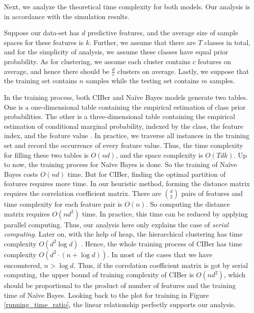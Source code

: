 \documentclass[twoside,11pt]{article}
\begin{document}
Next, we analyze the theoretical time complexity for both models. Our analysis is in accordance with the simulation results.

Suppose our data-set has $d$ predictive features, and the average size of sample spaces for these features is $k$. Further, we assume that there are $T$ classes in total, and for the simplicity of analysis, we assume these classes have equal prior probability. As for clustering, we assume each cluster contains $c$ features on average, and hence there should be $\frac{d}{c}$ clusters on average. Lastly, we suppose that the training set contains $n$ samples while the testing set contains $m$ samples. 

In the training process, both CIBer and Na\"ive Bayes models generate two tables. One is a one-dimensional table containing the empirical estimation of class prior probabilities. The other is a three-dimensional table containing the empirical estimation of conditional marginal probability, indexed by the class, the feature index, and the feature value \citep{zheng2005comparative}. In practice, we traverse all instances in the training set and record the occurrence of every feature value. Thus, the time complexity for filling these two tables is $O(nd)$, and the space complexity is $O(Tdk)$. Up to now, the training process for Na\"ive Bayes is done. So the training of Na\"ive Bayes costs $O(nd)$ time. But for CIBer, finding the optimal partition of features requires more time. In our heuristic method, forming the distance matrix requires the correlation coefficient matrix. There are $\binom{d}{2}$ pairs of features and time complexity for each feature pair is $O(n)$. So computing the distance matrix requires $O(nd^2)$ time. In practice, this time can be reduced by applying parallel computing. Thus, our analysis here only explains the case of \textit{serial computing}. Later on, with the help of heap, the hierarchical clustering has time complexity $O(d^2 \log d)$ \citep{kurita1991efficient}. Hence, the whole training process of CIBer has time complexity $O(d^2\cdot(n+\log d))$. In most of the cases that we have encountered, $n > \log d$. Thus, if the correlation coefficient matrix is got by serial computing, the upper bound of training complexity of CIBer is $O(nd^2)$, which should be proportional to the product of number of features and the training time of Na\"ive Bayes. Looking back to the plot for training in Figure \ref{running_time_ratio}, the linear relationship perfectly supports our analysis.
\end{document}
